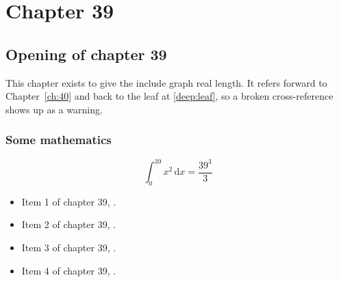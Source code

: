 \chapter{Chapter 39}
\label{ch:39}
\section{Opening of chapter 39}
This chapter exists to give the include graph real length. It refers
forward to Chapter~\ref{ch:40} and back to the leaf
at \ref{deep:leaf}, so a broken cross-reference shows up as a warning.

\subsection{Some mathematics}
\begin{equation}
  \int_0^{39} x^{2} \, \mathrm{d}x = \frac{39^{3}}{3}
\end{equation}

\begin{itemize}
  \item Item 1 of chapter 39, .
  \item Item 2 of chapter 39, .
  \item Item 3 of chapter 39, .
  \item Item 4 of chapter 39, .
\end{itemize}
